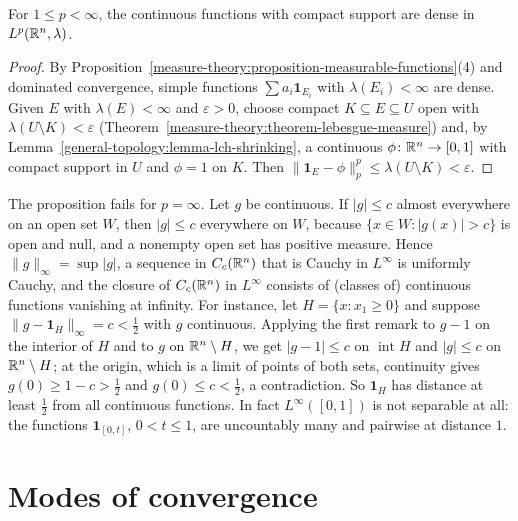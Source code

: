 \begin{proposition}\label{measure-theory:proposition-density}
For $1 \leq p < \infty$, the continuous functions with compact support are dense in $L^p(\mathbb{R}^n, \lambda)$.
\end{proposition}

\begin{proof}
By Proposition~\ref{measure-theory:proposition-measurable-functions}(4) and dominated convergence, simple functions $\sum a_i\mathbf{1}_{E_i}$ with $\lambda(E_i) < \infty$ are dense. Given $E$ with $\lambda(E) < \infty$ and
$\varepsilon > 0$, choose compact $K \subseteq E \subseteq U$ open with $\lambda(U \setminus K) < \varepsilon$ (Theorem~\ref{measure-theory:theorem-lebesgue-measure}) and, by
Lemma~\ref{general-topology:lemma-lch-shrinking}, a continuous $\phi \colon \mathbb{R}^n \to [0, 1]$ with compact support in $U$ and $\phi = 1$ on $K$. Then $\|\mathbf{1}_E - \phi\|_p^p \leq \lambda(U \setminus K) < \varepsilon$.
\end{proof}

\begin{counterexample}\label{measure-theory:counterexample-density-infinity}
The proposition fails for $p = \infty$. Let $g$ be continuous. If $|g| \leq c$ almost everywhere on an open set $W$, then $|g| \leq c$ everywhere on $W$, because $\{x \in W : |g(x)| > c\}$ is open and null,
and a nonempty open set has positive measure. Hence $\|g\|_\infty = \sup|g|$, a sequence in $C_c(\mathbb{R}^n)$ that is Cauchy in $L^\infty$ is uniformly Cauchy, and the closure of $C_c(\mathbb{R}^n)$ in $L^\infty$
consists of (classes of) continuous functions vanishing at infinity. For instance, let $H = \{x : x_1 \geq 0\}$ and suppose $\|g - \mathbf{1}_H\|_\infty = c < \frac12$ with $g$ continuous. Applying the
first remark to $g - 1$ on the interior of $H$ and to $g$ on $\mathbb{R}^n \setminus H$, we get $|g - 1| \leq c$ on $\operatorname{int}H$ and $|g| \leq c$ on $\mathbb{R}^n \setminus H$; at the origin, which is a limit of points
of both sets, continuity gives $g(0) \geq 1 - c > \frac12$ and $g(0) \leq c < \frac12$, a contradiction. So $\mathbf{1}_H$ has distance at least $\frac12$ from all continuous functions. In fact
$L^\infty([0, 1])$ is not separable at all: the functions $\mathbf{1}_{[0, t]}$, $0 < t \leq 1$, are uncountably many and pairwise at distance $1$.
\end{counterexample}

\section{Modes of convergence}\label{measure-theory:section-modes}

